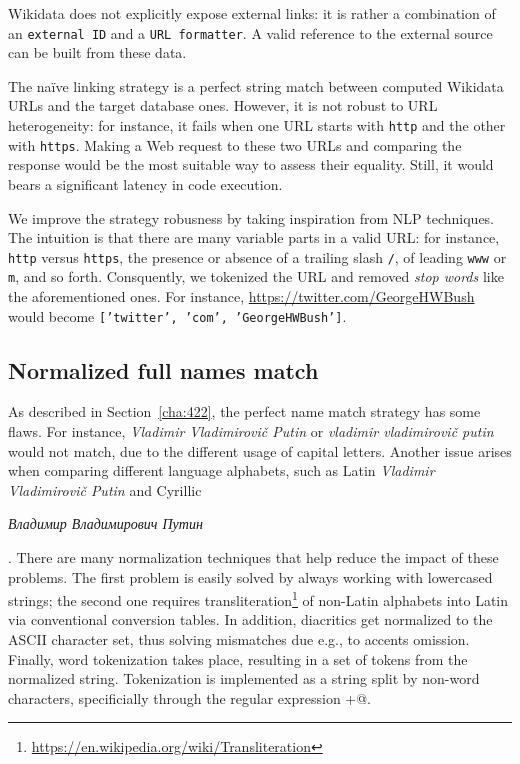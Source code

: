 Wikidata does not explicitly expose external links: it is rather a combination of an \texttt{external ID} and a \texttt{URL formatter}. A valid reference to the external source can be built from these data.

The naïve linking strategy is a perfect string match between computed Wikidata URLs and the target database ones. However, it is not robust to URL heterogeneity: for instance, it fails when one URL starts with \texttt{http} and the other with \texttt{https}. Making a Web request to these two URLs and comparing the response would be the most suitable way to assess their equality. Still, it would bears a significant latency in code execution.

We improve the strategy robusness by taking inspiration from NLP techniques.
The intuition is that there are many variable parts in a valid URL: for instance, \texttt{http} versus \texttt{https}, the presence or absence of a trailing slash \texttt{/}, of leading \texttt{www} or \texttt{m}, and so forth.
Consquently, we tokenized the URL and removed \textit{stop words} like the aforementioned ones. For instance, \url{https://twitter.com/GeorgeHWBush} would become \texttt{['twitter', 'com', 'GeorgeHWBush']}.

\subsection{Normalized full names match}
\label{cha:424}
As described in Section~\ref{cha:422}, the perfect name match strategy has some flaws. For instance, \textit{Vladimir Vladimirovič Putin} or \textit{vladimir vladimirovič putin} would not match, due to the different usage of capital letters. Another issue arises when comparing different language alphabets, such as Latin \textit{Vladimir Vladimirovič Putin} and Cyrillic \begin{otherlanguage}{russian}\textit{Владимир Владимирович Путин}\end{otherlanguage}.
There are many normalization techniques that help reduce the impact of these problems. The first problem is easily solved by always working with lowercased strings; the second one requires transliteration\footnote{\url{https://en.wikipedia.org/wiki/Transliteration}} of non-Latin alphabets into Latin via conventional conversion tables. In addition, diacritics get normalized to the ASCII character set, thus solving mismatches due e.g., to accents omission.
Finally, word tokenization takes place, resulting in a set of tokens from the normalized string. Tokenization is implemented as a string split by non-word characters, specificially through the regular expression \verb@\W+@.

